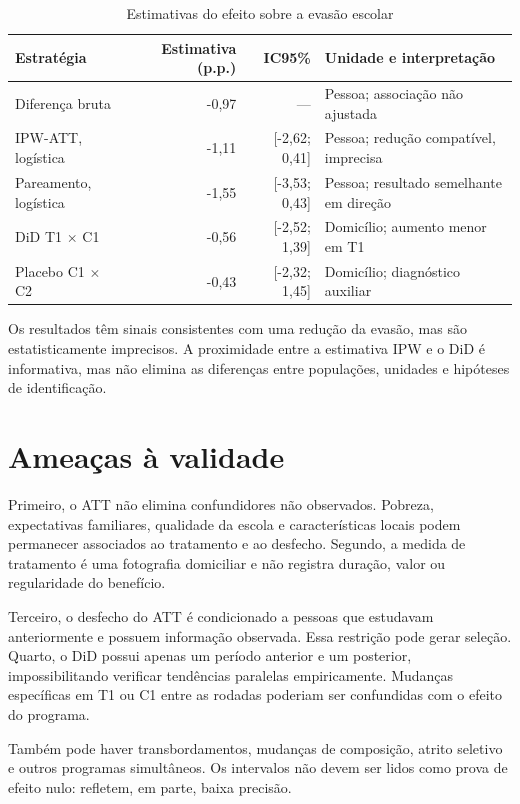 \documentclass[12pt,a4paper]{article}
\begin{document}
\begin{table}[ht]
\centering
\caption{Estimativas do efeito sobre a evasão escolar}
\begin{tabularx}{\textwidth}{>{\raggedright\arraybackslash}Xrr>{\raggedright\arraybackslash}X}
\toprule
Estratégia & Estimativa (p.p.) & IC95\% & Unidade e interpretação \\
\midrule
Diferença bruta & -0,97 & --- & Pessoa; associação não ajustada \\
IPW-ATT, logística & -1,11 & [-2,62; 0,41] & Pessoa; redução compatível, imprecisa \\
Pareamento, logística & -1,55 & [-3,53; 0,43] & Pessoa; resultado semelhante em direção \\
DiD T1 $\times$ C1 & -0,56 & [-2,52; 1,39] & Domicílio; aumento menor em T1 \\
Placebo C1 $\times$ C2 & -0,43 & [-2,32; 1,45] & Domicílio; diagnóstico auxiliar \\
\bottomrule
\end{tabularx}
\end{table}

Os resultados têm sinais consistentes com uma redução da evasão, mas são estatisticamente imprecisos. A proximidade entre a estimativa IPW e o DiD é informativa, mas não elimina as diferenças entre populações, unidades e hipóteses de identificação.

\section{Ameaças à validade}

Primeiro, o ATT não elimina confundidores não observados. Pobreza, expectativas familiares, qualidade da escola e características locais podem permanecer associados ao tratamento e ao desfecho. Segundo, a medida de tratamento é uma fotografia domiciliar e não registra duração, valor ou regularidade do benefício.

Terceiro, o desfecho do ATT é condicionado a pessoas que estudavam anteriormente e possuem informação observada. Essa restrição pode gerar seleção. Quarto, o DiD possui apenas um período anterior e um posterior, impossibilitando verificar tendências paralelas empiricamente. Mudanças específicas em T1 ou C1 entre as rodadas poderiam ser confundidas com o efeito do programa.

Também pode haver transbordamentos, mudanças de composição, atrito seletivo e outros programas simultâneos. Os intervalos não devem ser lidos como prova de efeito nulo: refletem, em parte, baixa precisão.
\end{document}
